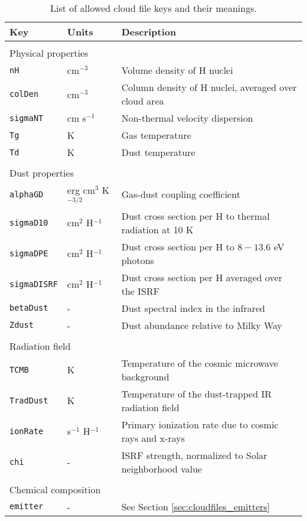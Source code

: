 \documentclass[12pt]{article}
\begin{document}
\begin{table}
\begin{center}
\begin{tabular}{lll}
\hline\hline
Key & Units & Description
\\ \hline\hline
\\
\multicolumn{3}{l}{Physical properties} \\
\hline
\verb=nH= & cm$^{-3}$ & Volume density of H nuclei \\
\verb=colDen= & cm$^{-3}$ & Column density of H nuclei, averaged over cloud area \\
\verb=sigmaNT= & cm s$^{-1}$ & Non-thermal velocity dispersion \\
\verb=Tg= & K & Gas temperature \\
\verb=Td= & K & Dust temperature \\
\\
\multicolumn{3}{l}{Dust properties} \\ \hline
\verb=alphaGD= & erg cm$^3$ K$^{-3/2}$ & Gas-dust coupling coefficient \\
\verb=sigmaD10= & cm$^2$ H$^{-1}$ & Dust cross section per H to thermal radiation at 10 K \\
\verb=sigmaDPE= & cm$^2$ H$^{-1}$ & Dust cross section per H to $8-13.6$ eV photons \\
\verb=sigmaDISRF= & cm$^2$ H$^{-1}$ & Dust cross section per H averaged over the ISRF \\
\verb=betaDust= & - & Dust spectral index in the infrared \\
\verb=Zdust= & - & Dust abundance relative to Milky Way\\
\\
\multicolumn{3}{l}{Radiation field} \\ \hline
\verb=TCMB= & K & Temperature of the cosmic microwave background \\
\verb=TradDust= & K & Temperature of the dust-trapped IR radiation field \\
\verb=ionRate= & s$^{-1}$ H$^{-1}$ & Primary ionization rate due to cosmic rays and x-rays\\
\verb=chi= & - & ISRF strength, normalized to Solar neighborhood value\\
\\
\multicolumn{3}{l}{Chemical composition} \\ \hline 
\verb=emitter= & - & See Section \ref{sec:cloudfiles_emitters}
\\ \hline
\end{tabular}
\caption{
\label{tab:cloudfiles}
List of allowed cloud file keys and their meanings.
}
\end{center}
\end{table}
\end{document}

